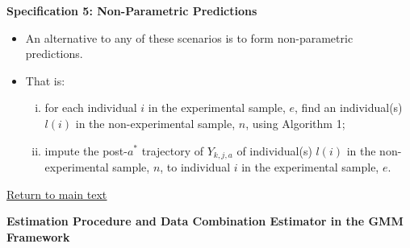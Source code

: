 \documentclass[static]{JJH-Beamer}
\begin{document}
\begin{frame}

\textbf{Specification 5: Non-Parametric Predictions}

\begin{itemize}
\item An alternative to any of these scenarios is to form non-parametric predictions.
\item That is:
    \begin{enumerate}[(i)]
    \item for each individual $i$ in the experimental sample, $e$, find an individual(s) $l(i)$ in the non-experimental sample, $n$, using Algorithm 1;
    \item impute the post-$a^*$ trajectory of $Y_{k,j,a}$ of individual(s) $l(i)$ in the non-experimental sample, $n$, to individual $i$ in the experimental sample, $e$.
    \end{enumerate}
\end{itemize}

\end{frame}

\begin{frame}

\begin{center}
\hyperlink{ret:candycane}{\underline{Return to main text}}
\end{center}

\end{frame}

\clearpage
{}
\begin{frame}

\hypertarget{cocopuffs}{}
\begin{center}
\textbf{Estimation Procedure and Data Combination Estimator in the GMM Framework}
\end{center}

\end{frame}
\end{document}
